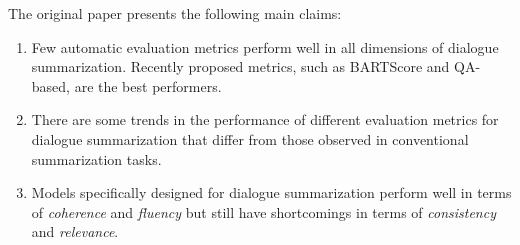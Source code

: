 %
The original paper presents the following main claims:
\begin{enumerate}
\item Few automatic evaluation metrics perform well in all dimensions of dialogue summarization. Recently proposed metrics, such as BARTScore and QA-based, are the best performers.
\item There are some trends in the performance of different evaluation metrics for dialogue summarization that differ from those observed in conventional summarization tasks. 
\item Models specifically designed for dialogue summarization perform well in terms of \textit{coherence }and \textit{fluency} but still have shortcomings in terms of \textit{consistency} and \textit{relevance}.
\end{enumerate}




